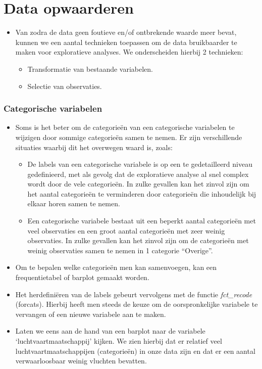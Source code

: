 \documentclass[]{tufte-book}
\providecommand{\tightlist}{%
  \setlength{\itemsep}{0pt}\setlength{\parskip}{0pt}}
\begin{document}
\hypertarget{data-opwaarderen}{%
\section{Data opwaarderen}\label{data-opwaarderen}}

\begin{itemize}
\tightlist
\item
  Van zodra de data geen foutieve en/of ontbrekende waarde meer bevat, kunnen we een aantal technieken toepassen om de data bruikbaarder te maken voor exploratieve analyses. We onderscheiden hierbij 2 technieken:

  \begin{itemize}
  \tightlist
  \item
    Transformatie van bestaande variabelen.
  \item
    Selectie van observaties.
  \end{itemize}
\end{itemize}

\hypertarget{categorische-variabelen}{%
\subsubsection{Categorische variabelen}\label{categorische-variabelen}}

\begin{itemize}
\tightlist
\item
  Soms is het beter om de categorieën van een categorische variabelen te wijzigen door sommige categorieën samen te nemen. Er zijn verschillende situaties waarbij dit het overwegen waard is, zoals:

  \begin{itemize}
  \tightlist
  \item
    De labels van een categorische variabele is op een te gedetailleerd niveau gedefinieerd, met als gevolg dat de exploratieve analyse al snel complex wordt door de vele categorieën. In zulke gevallen kan het zinvol zijn om het aantal categorieën te verminderen door categorieën die inhoudelijk bij elkaar horen samen te nemen.
  \item
    Een categorische variabele bestaat uit een beperkt aantal categorieën met veel observaties en een groot aantal categorieën met zeer weinig observaties. In zulke gevallen kan het zinvol zijn om de categorieën met weinig observaties samen te nemen in 1 categorie ``Overige''.
  \end{itemize}
\item
  Om te bepalen welke categorieën men kan samenvoegen, kan een frequentietabel of barplot gemaakt worden.
\item
  Het herdefiniëren van de labels gebeurt vervolgens met de functie \emph{fct\_recode} (forcats). Hierbij heeft men steeds de keuze om de oorspronkelijke variabele te vervangen of een nieuwe variabele aan te maken.
\item
  Laten we eens aan de hand van een barplot naar de variabele `luchtvaartmaatschappij' kijken. We zien hierbij dat er relatief veel luchtvaartmaatschappijen (categorieën) in onze data zijn en dat er een aantal verwaarloosbaar weinig vluchten bevatten.
\end{itemize}
\end{document}
